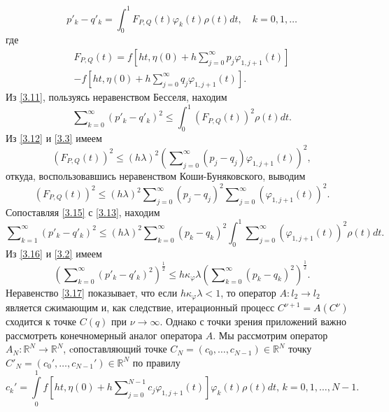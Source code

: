 \begin{equation}\label{3.11}
p'_k-q'_k=\int_{0}^1F_{P,Q}(t)\varphi_k(t)\rho(t)dt,\quad k=0,1,\ldots
\end{equation}
где
\begin{multline}\label{3.12}
 F_{P,Q}(t)=f\left[ht,\eta(0)+ h\sum\nolimits_{j=0}^\infty p_j\varphi_{1,j+1}(t)\right] \\
  -f\left[ht,\eta(0)+ h\sum\nolimits_{j=0}^\infty q_j\varphi_{1,j+1}(t)\right].
\end{multline}
Из \eqref{3.11}, пользуясь неравенством Бесселя, находим
 \begin{equation}\label{3.13}
\sum\nolimits_{k=0}^\infty (p'_k-q'_k)^2\le\int_{0}^1(F_{P,Q}(t))^2\rho(t) dt.
\end{equation}
Из \eqref{3.12} и \eqref{3.3}  имеем
 \begin{equation}\label{3.15}
(F_{P,Q}(t))^2\le (h\lambda)^2   \left(\sum\nolimits_{j=0}^\infty( p_j-q_j)\varphi_{1,j+1}(t)\right)^2,
\end{equation}
откуда,  воспользовавшись неравенством Коши-Буняковского, выводим
$$
(F_{P,Q}(t))^2\le(h\lambda)^2   \sum\nolimits_{j=0}^\infty( p_j-q_j)^2\sum\nolimits_{j=0}^\infty(\varphi_{1,j+1}(t))^2.
$$
Сопоставляя \eqref{3.15} с \eqref{3.13}, находим
\begin{equation}\label{3.16}
\sum\nolimits_{k=1}^\infty (p'_k-q'_k)^2\le(h\lambda)^2 \sum\nolimits_{k=0}^\infty( p_k-q_k)^2\int_{0}^1 \sum\nolimits_{j=0}^\infty(\varphi_{1,j+1}(t))^2\rho(t) dt.
\end{equation}
Из  \eqref{3.16}  и \eqref{3.2} имеем
\begin{equation}\label{3.17}
\left(\sum\nolimits_{k=0}^\infty (p'_k-q'_k)^2\right)^\frac12\le h\kappa_\varphi\lambda \left(\sum\nolimits_{k=0}^\infty (p_k-q_k)^2\right)^\frac12. \end{equation}
Неравенство \eqref{3.17} показывает, что если $h\kappa_\varphi\lambda<1$, то оператор  $A:l_2\to l_2$ является сжимающим и, как следствие, итерационный процесс $C^{\nu+1}=A(C^{\nu})$  сходится к точке $C(q)$ при $\nu\to\infty$. Однако с точки зрения приложений важно рассмотреть конечномерный аналог оператора $A$. Мы рассмотрим оператор $A_N:\mathbb{R}^N\to \mathbb{R}^N$, cопоставляющий точке
$C_N=(c_0,\ldots,c_{N-1})\in \mathbb{R}^N $ точку  $C'_N=(c_0',\ldots,c_{N-1}')\in \mathbb{R}^N $ по правилу
\begin{equation}\label{3.18}
c_k'=\int\limits_{0}^1f\left[ht,\eta(0)+ h\sum\nolimits_{j=0}^{N-1} c_j\varphi_{1,j+1}(t)\right]\varphi_k(t)\rho(t) dt,\,k=0,1,\ldots, N-1.
\end{equation}
